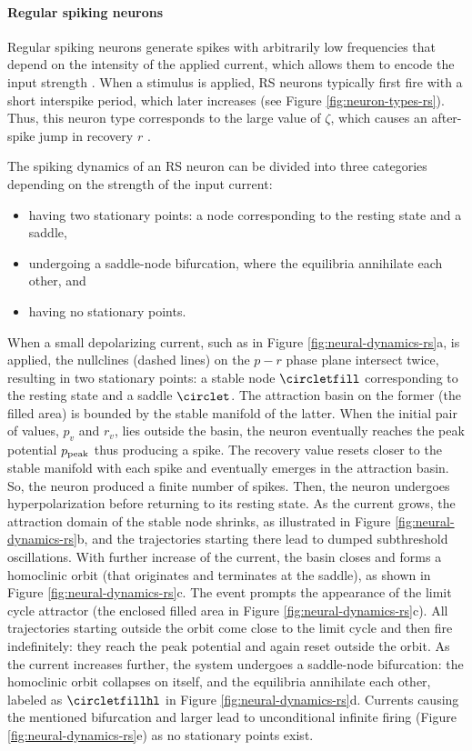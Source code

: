 \paragraph{Regular spiking neurons}

Regular spiking neurons generate spikes with arbitrarily low frequencies that depend on the intensity of the applied current, which allows them to encode the input strength \cite{IzhikevichBook2004:10}.
When a stimulus is applied, RS neurons typically first fire with a short interspike period, which later increases (see Figure \ref{fig:neuron-types-rs}).    Thus, this neuron type corresponds to the large value of $\zeta$, which causes an after-spike jump in recovery $r$ \cite{Izhikevich2003}.

The spiking dynamics of an RS neuron can be divided into three categories depending on the strength of the input current:
\begin{itemize}
    \item having two stationary points: a node corresponding to the resting state and a saddle,
    \item undergoing a saddle-node bifurcation, where the equilibria annihilate each other, and
    \item having no stationary points.
\end{itemize}

When a small depolarizing current, such as in Figure \ref{fig:neural-dynamics-rs}a, is applied, the nullclines (dashed lines) on the $p-r$ phase plane intersect twice, resulting in two stationary points: a stable node $\circletfill$ corresponding to the resting state and a saddle $\circlet$. The attraction basin on the former (the filled area) is bounded by the stable manifold of the latter. When the initial pair of values, $p_v$ and $r_v$, lies outside the basin, the neuron eventually reaches the peak potential $p_{\mathrm{peak}}$ thus producing a spike. The recovery value resets closer to the stable manifold with each spike and eventually emerges in the attraction basin. So, the neuron produced a finite number of spikes. Then, the neuron undergoes hyperpolarization before returning to its resting state. As the current grows, the attraction domain of the stable node shrinks, as illustrated in Figure \ref{fig:neural-dynamics-rs}b, and the trajectories starting there lead to dumped subthreshold oscillations. With further increase of the current, the basin closes and forms a homoclinic orbit (that originates and terminates at the saddle), as shown in Figure \ref{fig:neural-dynamics-rs}c. The event prompts the appearance of the limit cycle attractor (the enclosed filled area in Figure \ref{fig:neural-dynamics-rs}c). All trajectories starting outside the orbit come close to the limit cycle and then fire indefinitely: they reach the peak potential and again reset outside the orbit. As the current increases further, the system undergoes a saddle-node bifurcation: the homoclinic orbit collapses on itself, and the equilibria annihilate each other, labeled as $\circletfillhl$ in Figure \ref{fig:neural-dynamics-rs}d. Currents causing the mentioned bifurcation and larger lead to unconditional infinite firing (Figure \ref{fig:neural-dynamics-rs}e) as no stationary points exist.


